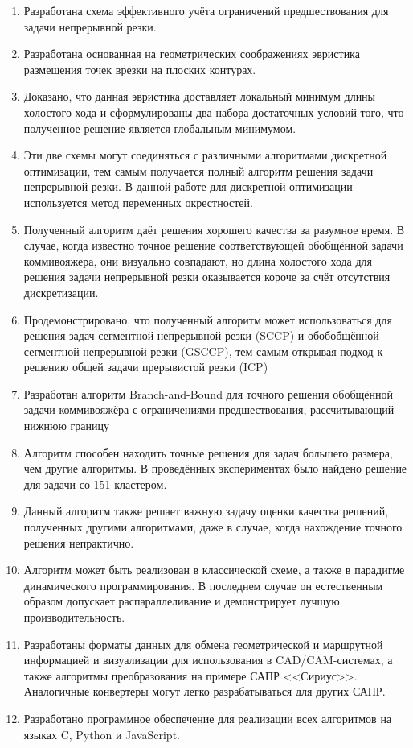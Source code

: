 \documentclass[14pt]{extarticle}
\begin{document}
\begin{enumerate}
    \item 
    Разработана схема эффективного учёта ограничений предшествования для
    задачи непрерывной резки.
    \item 
    Разработана основанная на геометрических соображениях эвристика
    размещения точек врезки на плоских контурах.
    \item 
    Доказано, что данная эвристика доставляет локальный минимум длины холостого хода
    и сформулированы два набора достаточных условий того,
    что полученное решение является глобальным минимумом.
    \item 
    Эти две схемы могут соединяться с различными алгоритмами дискретной оптимизации,
    тем самым получается полный алгоритм решения задачи непрерывной резки.
    В данной работе для дискретной оптимизации используется
    метод переменных окрестностей.
    \item
    Полученный алгоритм даёт решения хорошего качества за разумное время. 
    В случае, когда известно точное решение соответствующей обобщённой
    задачи коммивояжера, они визуально совпадают, но длина холостого
    хода для решения задачи непрерывной резки оказывается короче за счёт
    отсутствия дискретизации.
    \item
    Продемонстрировано, что полученный алгоритм может использоваться для 
    решения задач сегментной непрерывной резки (SCCP) 
    и обобобщённой сегментной непрерывной резки (GSCCP),
    тем самым открывая подход к решению общей задачи прерывистой резки
    (ICP)
    \item 
    Разработан алгоритм Branch-and-Bound для точного решения
    обобщённой задачи коммивояжёра с ограничениями предшествования,
    рассчитывающий нижнюю границу
    \item 
    Алгоритм способен находить точные решения для задач большего размера,
    чем другие алгоритмы. 
    В проведённых экспериментах было найдено решение для 
    задачи со 151 кластером.
    \item 
    Данный алгоритм также решает важную задачу оценки качества
    решений, полученных другими алгоритмами,
    даже в случае, когда нахождение точного решения непрактично.
    \item 
    Алгоритм может быть реализован в классической схеме,
    а также в парадигме динамического программирования. 
    В последнем случае он естественным образом допускает
    распараллеливание и демонстрирует лучшую производительность.
    \item 
    Разработаны форматы данных для обмена геометрической и маршрутной 
    информацией и визуализации для использования в CAD/CAM-системах, 
    а также алгоритмы преобразования на примере САПР <<Сириус>>.
    Аналогичные конвертеры могут легко разрабатываться для других САПР.
    \item 
    Разработано программное обеспечение для реализации всех алгоритмов
    на языках C, Python и JavaScript.
\end{enumerate}
\end{document}

